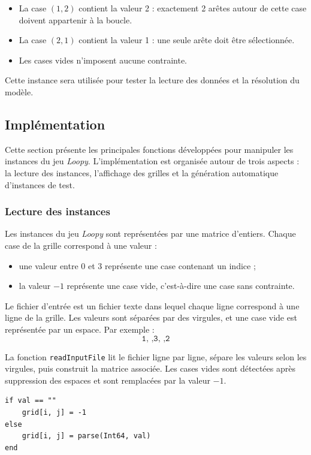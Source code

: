\begin{itemize}
    \item La case \((1,2)\) contient la valeur 2 : exactement 2 arêtes autour de cette case doivent appartenir à la boucle.
    \item La case \((2,1)\) contient la valeur 1 : une seule arête doit être sélectionnée.
    \item Les cases vides n’imposent aucune contrainte.
\end{itemize}

Cette instance sera utilisée pour tester la lecture des données et la résolution du modèle.

\subsection{Implémentation}

Cette section présente les principales fonctions développées pour manipuler les instances du jeu \textit{Loopy}. L'implémentation est organisée autour de trois aspects : la lecture des instances, l'affichage des grilles et la génération automatique d'instances de test.

\subsubsection{Lecture des instances}

Les instances du jeu \textit{Loopy} sont représentées par une matrice d'entiers. Chaque case de la grille correspond à une valeur :
\begin{itemize}
    \item une valeur entre \(0\) et \(3\) représente une case contenant un indice ;
    \item la valeur \(-1\) représente une case vide, c'est-à-dire une case sans contrainte.
\end{itemize}

Le fichier d'entrée est un fichier texte dans lequel chaque ligne correspond à une ligne de la grille. Les valeurs sont séparées par des virgules, et une case vide est représentée par un espace. Par exemple :
\[
\texttt{1, ,3, ,2}
\]

La fonction \texttt{readInputFile} lit le fichier ligne par ligne, sépare les valeurs selon les virgules, puis construit la matrice associée. Les cases vides sont détectées après suppression des espaces et sont remplacées par la valeur \(-1\).

\begin{verbatim}
if val == ""
    grid[i, j] = -1
else
    grid[i, j] = parse(Int64, val)
end
\end{verbatim}

